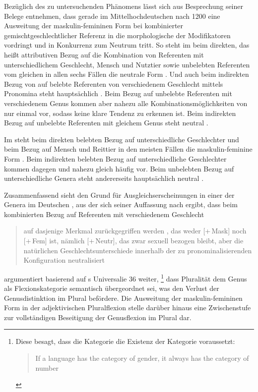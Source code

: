 Bezüglich des zu untersuchenden Phänomens lässt sich aus 
Besprechung seiner Belege entnehmen, dass gerade im
Mittelhochdeutschen nach 1200 eine Ausweitung der
maskulin-femininen Form bei kombinierter gemischt\-geschlechtlicher Referenz in
die morphologische  der Modifikatoren vordringt und
in Konkurrenz zum Neutrum tritt. So steht im
 beim direkten, das heißt attributiven Bezug auf die
Kombination von Referenten mit unterschiedlichem Geschlecht, Mensch und
Nutztier sowie unbelebten Referenten vom gleichen  in
allen sechs Fällen die neutrale Form . Und auch beim indirekten
Bezug von  auf belebte Referenten von verschiedenem
Geschlecht mittels Pronomina steht hauptsächlich . Beim Bezug
auf unbelebte Referenten mit verschiedenem Genus kommen aber nahezu alle
Kombinationsmöglichkeiten von  nur einmal vor,
sodass keine klare Tendenz zu erkennen ist. Beim indirekten Bezug auf unbelebte
Referenten mit gleichem Genus steht neutral 
\autocites[145--148, 158--161]{askedal1973}[nach][]{lachmannhartl1952}.

Im  steht beim direkten belebten Bezug auf
unterschiedliche Geschlechter und beim Bezug auf Mensch und Reittier in den
meisten Fällen die maskulin-feminine Form . Beim indirekten
belebten Bezug auf unterschiedliche Geschlechter kommen dagegen
 und  nahezu gleich häufig vor. Beim
unbelebten Bezug auf unterschiedliche Genera steht
andererseits hauptsächlich neutral  \autocites[95--99,
126--128]{askedal1973}[nach][]{maroldschroeder1969}.

Zusammenfassend sieht \citeauthor{askedal1973} den Grund für
Ausgleichserscheinungen in einer 
der Genera im Deutschen
\autocite[241--247]{askedal1973}, aus der sich seiner Auffassung nach ergibt,
dass beim kombinierten Bezug auf Referenten mit verschiedenem Geschlecht
\blockcquote[253]{askedal1973}{auf dasjenige Merkmal zurückgegriffen werden
, das weder [+\,Mask] noch [+\,Fem] ist, nämlich [+\,Neutr], das
zwar sexuell bezogen bleibt, aber die natürlichen Geschlechts\-unterschiede
innerhalb der zu pronominalisierenden Konfiguration neutralisiert}.
\citet[173--177]{askedal1973} argumentiert basierend auf
\citeauthor{greenberg1966}s Universalie 36 weiter,%
%
	\footnote{Diese besagt, dass die Kategorie  die Existenz der
		Kategorie  voraussetzt:
		\foreignblockcquote{english}[112]{greenberg1966}{If a language has
		the category of gender, it always has the category of
		number}.%
	}
%
dass Pluralität dem Genus als Flexionskategorie semantisch übergeordnet sei,
was den Verlust der Genusdistinktion im Plural
befördere. Die Ausweitung der maskulin-femininen Form in der adjektivischen
Plural\-flexion stelle darüber hinaus eine
Zwischenstufe zur vollständigen Beseitigung der Genusflexion im Plural dar.

